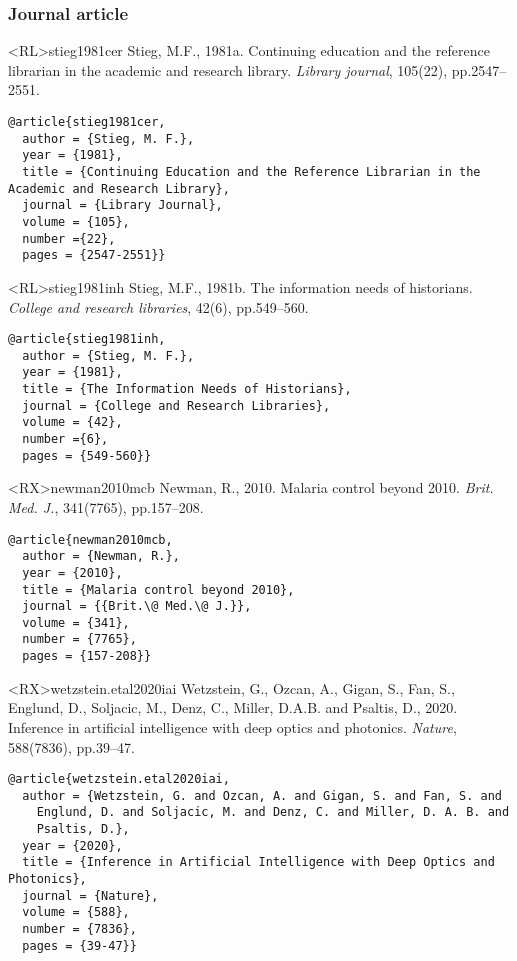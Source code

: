 \documentclass[10pt,a4paper]{article}
\begin{document}
\subsubsection*{Journal article}

\begin{bibexbox}<RL>{stieg1981cer}
  Stieg, M.F., 1981a. Continuing education and the reference librarian in the academic and research library. \emph{Library journal}, 105(22), pp.2547--2551.
  \tcblower
\begin{Verbatim}
@article{stieg1981cer,
  author = {Stieg, M. F.},
  year = {1981},
  title = {Continuing Education and the Reference Librarian in the Academic and Research Library},
  journal = {Library Journal},
  volume = {105},
  number ={22},
  pages = {2547-2551}}
\end{Verbatim}
\end{bibexbox}

\begin{bibexbox}<RL>{stieg1981inh}
  Stieg, M.F., 1981b. The information needs of historians. \emph{College and research libraries}, 42(6), pp.549--560.
  \tcblower
\begin{Verbatim}
@article{stieg1981inh,
  author = {Stieg, M. F.},
  year = {1981},
  title = {The Information Needs of Historians},
  journal = {College and Research Libraries},
  volume = {42},
  number ={6},
  pages = {549-560}}
\end{Verbatim}
\end{bibexbox}

\begin{bibexbox}<RX>{newman2010mcb}
  Newman, R., 2010. Malaria control beyond 2010. \emph{Brit. Med. J.}, 341(7765), pp.157--208.
  \tcblower
\begin{Verbatim}
@article{newman2010mcb,
  author = {Newman, R.},
  year = {2010},
  title = {Malaria control beyond 2010},
  journal = {{Brit.\@ Med.\@ J.}},
  volume = {341},
  number = {7765},
  pages = {157-208}}
\end{Verbatim}
\end{bibexbox}

\begin{bibexbox}<RX>{wetzstein.etal2020iai}
  Wetzstein, G., Ozcan, A., Gigan, S., Fan, S., Englund, D., Soljacic, M., Denz, C., Miller, D.A.B. and Psaltis, D., 2020. Inference in artificial intelligence with deep optics and photonics. \emph{Nature}, 588(7836), pp.39--47.
  \tcblower
\begin{Verbatim}
@article{wetzstein.etal2020iai,
  author = {Wetzstein, G. and Ozcan, A. and Gigan, S. and Fan, S. and
    Englund, D. and Soljacic, M. and Denz, C. and Miller, D. A. B. and
    Psaltis, D.},
  year = {2020},
  title = {Inference in Artificial Intelligence with Deep Optics and Photonics},
  journal = {Nature},
  volume = {588},
  number = {7836},
  pages = {39-47}}
\end{Verbatim}
\end{bibexbox}
\end{document}
